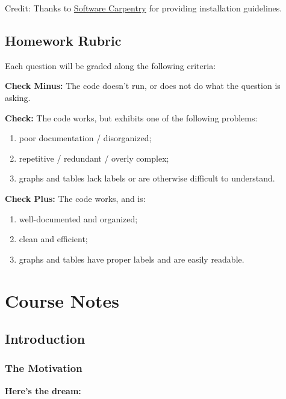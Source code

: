 \documentclass[]{book}
\providecommand{\tightlist}{%
  \setlength{\itemsep}{0pt}\setlength{\parskip}{0pt}}
\begin{document}
Credit: Thanks to
\href{http://software-carpentry.org/workshops/}{Software Carpentry} for
providing installation guidelines.

\chapter{Homework Rubric}\label{homework-rubric}

Each question will be graded along the following criteria:

\textbf{Check Minus:} The code doesn't run, or does not do what the
question is asking.

\textbf{Check:} The code works, but exhibits one of the following
problems:

\begin{enumerate}
\def\labelenumi{\arabic{enumi})}
\tightlist
\item
  poor documentation / disorganized;
\item
  repetitive / redundant / overly complex;
\item
  graphs and tables lack labels or are otherwise difficult to
  understand.
\end{enumerate}

\textbf{Check Plus:} The code works, and is:

\begin{enumerate}
\def\labelenumi{\arabic{enumi})}
\tightlist
\item
  well-documented and organized;
\item
  clean and efficient;
\item
  graphs and tables have proper labels and are easily readable.
\end{enumerate}

\part{Course Notes}\label{part-course-notes}

\chapter{Introduction}\label{introduction}

\section{The Motivation}\label{the-motivation}

\textbf{Here's the dream:}
\end{document}
